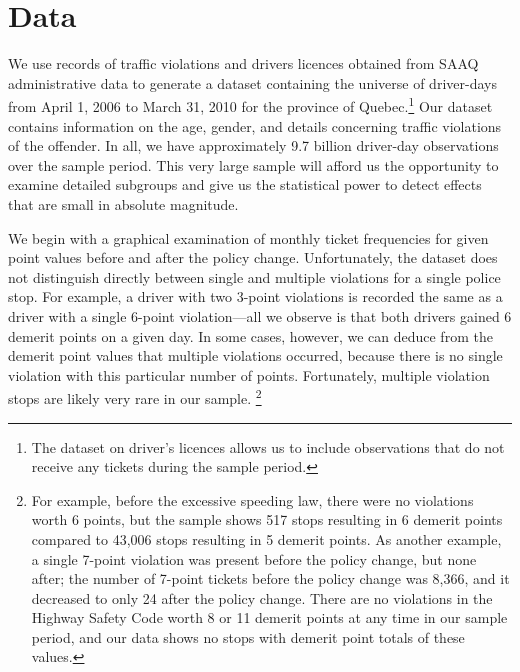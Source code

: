 \documentclass{cje}
\begin{document}

\section{Data}
\label{sec:Data}


We use records of traffic violations and drivers licences obtained 
from SAAQ administrative data to generate a dataset containing 
the universe of driver-days from April 1, 2006 to March 31, 2010 
for the province of Quebec.\footnote{%
The dataset on driver’s licences allows us to include observations 
that do not receive any tickets during the sample period.}  
Our dataset contains information on the age, gender, 
and details concerning traffic violations of the offender. 
In all, we have approximately 9.7 billion driver-day observations 
over the sample period. 
This very large sample will afford us the opportunity to examine 
detailed subgroups and give us the statistical power 
to detect effects that are small in absolute magnitude.

We begin with a graphical examination of monthly ticket frequencies for given point values 
before and after the policy change. 
%
Unfortunately, the dataset does not distinguish directly 
between single and multiple violations for a single police stop. 
For example, a driver with two 3-point violations 
is recorded the same as 
a driver with a single 6-point violation---all we observe is that 
both drivers gained 6 demerit points on a given day. 
In some cases, however, we can deduce from the demerit point values 
that multiple violations occurred, because there is no single violation with this particular number of points.
%
Fortunately, multiple violation stops are likely very rare in our sample.%
\footnote{%
For example, before the excessive speeding law, 
there were no violations worth 6 points, 
but the sample shows 517 stops resulting in 6 demerit points 
compared to 43,006 stops resulting in 5 demerit points. 
As another example, a single 7-point violation was present 
before the policy change, but none after; 
the number of 7-point tickets before the policy change was 8,366, 
and it decreased to only 24 after the policy change. 
There are no violations in the Highway Safety Code worth 8 or 11 demerit points 
at any time in our sample period, 
and our data shows no stops with demerit point totals of these values.}
\end{document}

